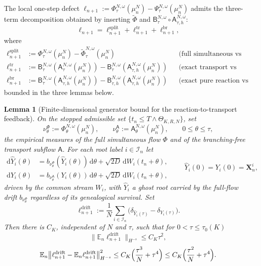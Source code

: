 \documentclass[a4paper,fleqn]{cas-sc}
\newtheorem{lemma}[theorem]{Lemma}
\theoremstyle{definition}
\theoremstyle{remark}
\begin{document}
The local one-step defect
$\ell_{n+1}:=\Phi^{N,\omega}_\tau(\mu^N_n)-\Psi^{N,\omega}_\tau(\mu^N_n)$
admits the three-term decomposition obtained by inserting $\widetilde\Phi$ and
$\mathsf B^{N,\omega}_\tau\circ\mathsf A^{N,\omega}_{\tau,h}$:
\[
\ell_{n+1}=\ell^{\mathrm{split}}_{n+1}+\ell^{\mathrm{tr}}_{n+1}+\ell^{\mathrm{br}}_{n+1},
\]
where
\begin{align*}
\ell^{\mathrm{split}}_{n+1}
&:=\Phi^{N,\omega}_\tau(\mu^N_n)-\widetilde\Phi^{N,\omega}_\tau(\mu^N_n)
&&\text{(full simultaneous vs exact Lie split),}\\
\ell^{\mathrm{tr}}_{n+1}
&:=\mathsf B^{N,\omega}_\tau(\mathsf A^{N,\omega}_\tau(\mu^N_n))
   -\mathsf B^{N,\omega}_\tau(\mathsf A^{N,\omega}_{\tau,h}(\mu^N_n))
&&\text{(exact transport vs EM, then exact branching),}\\
\ell^{\mathrm{br}}_{n+1}
&:=\mathsf B^{N,\omega}_\tau(\mathsf A^{N,\omega}_{\tau,h}(\mu^N_n))
   -\mathsf B^{N,\omega}_{\tau,h}(\mathsf A^{N,\omega}_{\tau,h}(\mu^N_n))
&&\text{(exact pure reaction vs frozen-rate branching),}
\end{align*}
bounded in the three lemmas below.

\begin{lemma}[Finite-dimensional generator bound for the reaction-to-transport feedback]\label{lem:drift-feedback-generator}
On the stopped admissible set $\{t_n\le T\wedge\Theta_{K,R,N}\}$, set
\[
\nu^\Phi_\theta:=\Phi^{N,\omega}_\theta(\mu^N_n),\qquad
\nu^{\mathsf A}_\theta:=\mathsf A^{N,\omega}_\theta(\mu^N_n),\qquad 0\le\theta\le\tau,
\]
the empirical measures of the full simultaneous flow $\Phi$ and of the branching-free
transport subflow $\mathsf A$. For each root label $i\in\mathcal I_n$ let
\[
\begin{aligned}
\mathrm d\widehat Y_i(\theta)
&= b_{\nu^\Phi_\theta}(\widehat Y_i(\theta))\,\mathrm d\theta
   +\sqrt{2D}\,\mathrm dW_i(t_n+\theta),\\
\mathrm dY_i(\theta)
&= b_{\nu^{\mathsf A}_\theta}(Y_i(\theta))\,\mathrm d\theta
   +\sqrt{2D}\,\mathrm dW_i(t_n+\theta),
\end{aligned}
\qquad
\widehat Y_i(0)=Y_i(0)=\mathbf X^i_n,
\]
driven by the common stream $W_i$, with $\widehat Y_i$ a ghost root carried by the
full-flow drift $b_{\nu^\Phi_\theta}$ regardless of its genealogical survival. Set
\[
\ell^{\mathrm{drift}}_{n+1}
:=\frac1N\sum_{i\in\mathcal I_n}\bigl(\delta_{\widehat Y_i(\tau)}-\delta_{Y_i(\tau)}\bigr).
\]
Then there is $C_K$, independent of $N$ and $\tau$, such that for $0<\tau\le\tau_0(K)$
\[
\bigl\|\mathbb E_n\ell^{\mathrm{drift}}_{n+1}\bigr\|_{H^{-s}}\le C_K\tau^2,
\]
\[
\mathbb E_n\bigl\|\ell^{\mathrm{drift}}_{n+1}-\mathbb E_n\ell^{\mathrm{drift}}_{n+1}\bigr\|_{H^{-s}}^2
\le C_K\Bigl(\frac{\tau^3}{N}+\tau^4\Bigr)
\le C_K\Bigl(\frac{\tau^2}{N}+\tau^4\Bigr).
\]
\end{lemma}
\end{document}
